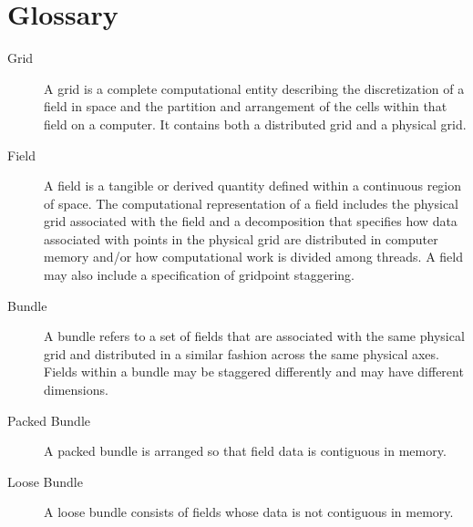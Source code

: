 
\section{Glossary}

\begin{description}

\item [Grid] \label{glos:grid} A grid is a complete computational entity
describing the discretization of a field in space and the partition 
and arrangement of the cells within that field on a computer.
It contains both a distributed grid and a physical grid.

\item [Field] \label{glos:fld} A field is a tangible or derived quantity
defined within a continuous region of space.  The computational representation 
of a field includes the physical grid associated with the field and a 
decomposition that specifies how data associated with points in the 
physical grid are distributed in computer memory and/or how computational 
work is divided among threads.  A field may also include a specification 
of gridpoint staggering.

\item [Bundle] \label{glos:bundle} A bundle refers to a set of fields that 
are associated with the same physical grid and distributed in a similar 
fashion across the same physical axes.  Fields within a bundle may be
staggered differently and may have different dimensions.

\item [Packed Bundle] \label{glos:packedbundle} A packed bundle is arranged
so that field data is contiguous in memory.

\item [Loose Bundle] \label{glos:loosebundle} A loose bundle consists of 
fields whose data is not contiguous in memory.

\end{description}















